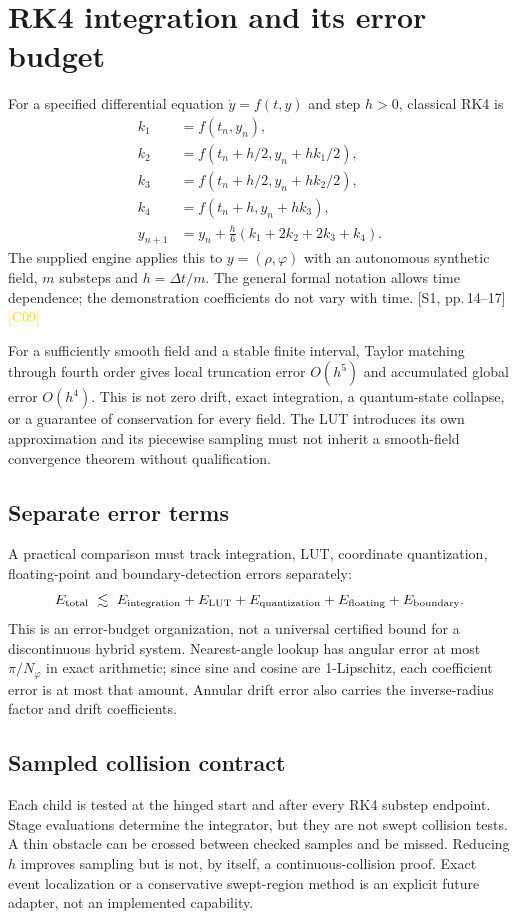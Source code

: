 \documentclass[11pt,a4paper]{article}
\newcommand{\src}[2]{\textcolor{muted}{[#1, #2]}}
\newcommand{\corr}[1]{\textcolor{gold}{\textsf{[#1]}}}
\newcommand{\ph}{\varphi}
\begin{document}
\section{RK4 integration and its error budget}
For a specified differential equation $\dot y=f(t,y)$ and step $h>0$, classical RK4 is
\begin{align}
 k_1&=f(t_n,y_n),\\
 k_2&=f(t_n+h/2,y_n+hk_1/2),\\
 k_3&=f(t_n+h/2,y_n+hk_2/2),\\
 k_4&=f(t_n+h,y_n+hk_3),\\
 y_{n+1}&=y_n+\frac h6(k_1+2k_2+2k_3+k_4).
\end{align}
The supplied engine applies this to $y=(\rho,\ph)$ with an autonomous synthetic field, $m$ substeps and $h=\Delta t/m$. The general formal notation allows time dependence; the demonstration coefficients do not vary with time. \src{S1}{pp.\,14--17} \corr{C09}

For a sufficiently smooth field and a stable finite interval, Taylor matching through fourth order gives local truncation error $O(h^5)$ and accumulated global error $O(h^4)$. This is not zero drift, exact integration, a quantum-state collapse, or a guarantee of conservation for every field. The LUT introduces its own approximation and its piecewise sampling must not inherit a smooth-field convergence theorem without qualification.

\subsection{Separate error terms}
A practical comparison must track integration, LUT, coordinate quantization, floating-point and boundary-detection errors separately:
\begin{equation}
 E_{\rm total}\ \lesssim\ E_{\rm integration}+E_{\rm LUT}
   +E_{\rm quantization}+E_{\rm floating}+E_{\rm boundary}.
\end{equation}
This is an error-budget organization, not a universal certified bound for a discontinuous hybrid system. Nearest-angle lookup has angular error at most $\pi/N_\ph$ in exact arithmetic; since sine and cosine are 1-Lipschitz, each coefficient error is at most that amount. Annular drift error also carries the inverse-radius factor and drift coefficients.

\subsection{Sampled collision contract}
Each child is tested at the hinged start and after every RK4 substep endpoint. Stage evaluations determine the integrator, but they are not swept collision tests. A thin obstacle can be crossed between checked samples and be missed. Reducing $h$ improves sampling but is not, by itself, a continuous-collision proof. Exact event localization or a conservative swept-region method is an explicit future adapter, not an implemented capability.
\end{document}
